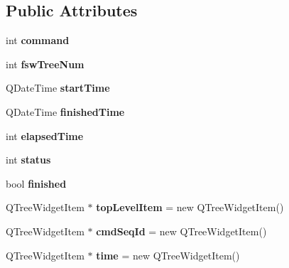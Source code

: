 \subsection*{Public Attributes}
\begin{DoxyCompactItemize}
\item 
int {\bfseries command}\hypertarget{class_f_s_w_item_a13a256093f08ca67d69b68ddfca7c099}{}\label{class_f_s_w_item_a13a256093f08ca67d69b68ddfca7c099}

\item 
int {\bfseries fsw\+Tree\+Num}\hypertarget{class_f_s_w_item_ac19e1c46496274ab4f4fdca5e29464b6}{}\label{class_f_s_w_item_ac19e1c46496274ab4f4fdca5e29464b6}

\item 
Q\+Date\+Time {\bfseries start\+Time}\hypertarget{class_f_s_w_item_a0801d1ed513b828d83099bd86640913b}{}\label{class_f_s_w_item_a0801d1ed513b828d83099bd86640913b}

\item 
Q\+Date\+Time {\bfseries finished\+Time}\hypertarget{class_f_s_w_item_a53d42af2d29472d8dcd85392f8d89ede}{}\label{class_f_s_w_item_a53d42af2d29472d8dcd85392f8d89ede}

\item 
int {\bfseries elapsed\+Time}\hypertarget{class_f_s_w_item_a09eca3db2340afdb33ae4deffc8f597a}{}\label{class_f_s_w_item_a09eca3db2340afdb33ae4deffc8f597a}

\item 
int {\bfseries status}\hypertarget{class_f_s_w_item_a0966a2b54240520ec0008f5167716912}{}\label{class_f_s_w_item_a0966a2b54240520ec0008f5167716912}

\item 
bool {\bfseries finished}\hypertarget{class_f_s_w_item_adf25d4aa3a24bac7a9d9c65bb92d40f8}{}\label{class_f_s_w_item_adf25d4aa3a24bac7a9d9c65bb92d40f8}

\item 
Q\+Tree\+Widget\+Item $\ast$ {\bfseries top\+Level\+Item} = new Q\+Tree\+Widget\+Item()\hypertarget{class_f_s_w_item_a1aec32aefd792eefad9933cde4a9015a}{}\label{class_f_s_w_item_a1aec32aefd792eefad9933cde4a9015a}

\item 
Q\+Tree\+Widget\+Item $\ast$ {\bfseries cmd\+Seq\+Id} = new Q\+Tree\+Widget\+Item()\hypertarget{class_f_s_w_item_a528172e13eb4085704a426f7a6a8e12b}{}\label{class_f_s_w_item_a528172e13eb4085704a426f7a6a8e12b}

\item 
Q\+Tree\+Widget\+Item $\ast$ {\bfseries time} = new Q\+Tree\+Widget\+Item()\hypertarget{class_f_s_w_item_a5d3a49aa680e6711aa35ebc31ab60823}{}\label{class_f_s_w_item_a5d3a49aa680e6711aa35ebc31ab60823}


\end{DoxyCompactItemize}
